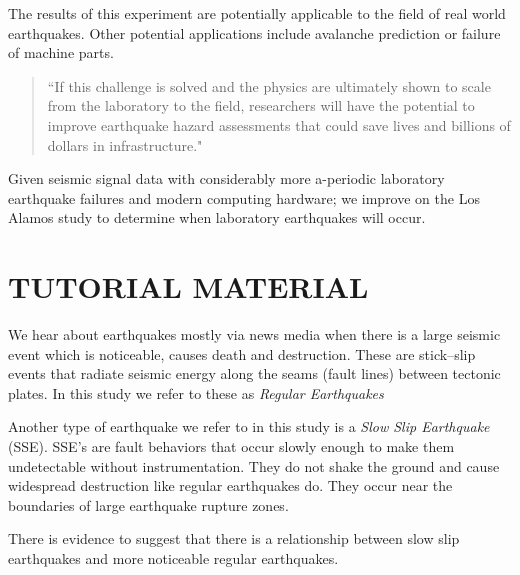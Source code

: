 \documentclass[]{llncs}
\begin{document}
The results of this experiment are potentially applicable to the field of real world earthquakes. Other potential applications include avalanche prediction or failure of machine parts.
\begin{quote}
	“If this challenge is solved and the physics are ultimately shown to scale from the laboratory to the field, researchers will have the potential to improve earthquake hazard assessments that could save lives and billions of dollars in infrastructure.\cite{kaggle}"
\end{quote}

Given seismic signal data with considerably more a-periodic laboratory earthquake failures and modern computing hardware; we improve on the Los Alamos study\cite{Bertrand} to determine when laboratory earthquakes will occur.





\section{TUTORIAL MATERIAL}
We hear about earthquakes mostly via news media when there is a large seismic event which is noticeable, causes death and destruction. These are stick–slip events that radiate seismic energy along the seams (fault lines) between tectonic plates. In this study we refer to these as {\em Regular Earthquakes} \par

Another type of earthquake we refer to in this study is a {\em 
	Slow Slip Earthquake} (SSE). SSE's are fault behaviors that occur slowly enough to make them undetectable without instrumentation. They do not shake the ground and cause widespread destruction like regular earthquakes do. They occur near the boundaries of large earthquake rupture zones\cite{Slip}. \par

There is evidence to suggest that there is a relationship between slow slip earthquakes and more noticeable regular earthquakes\cite{SlowSlip}. \par
\end{document}
